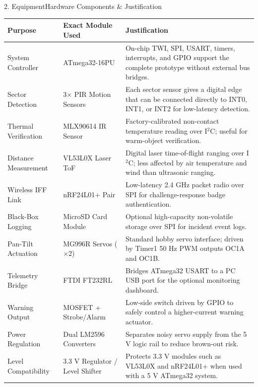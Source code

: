 \documentclass[aspectratio=169, 10pt]{beamer}
\begin{document}
\begin{frame}{2. Equipment}{Hardware Components \& Justification}
    \tiny
    \begin{table}
        \centering
        \begin{tabular}{p{2.15cm} p{2.85cm} p{5.6cm}}
            \toprule
            \textbf{\color{Accent} Purpose} & \textbf{\color{Accent} Exact Module Used} & \textbf{\color{Accent} Justification} \\
            \midrule
            System Controller & ATmega32-16PU & On-chip TWI, SPI, USART, timers, interrupts, and GPIO support the complete prototype without external bus bridges. \\
            Sector Detection & 3$\times$ PIR Motion Sensors & Each sector sensor gives a digital edge that can be connected directly to INT0, INT1, or INT2 for low-latency detection. \\
            Thermal Verification & MLX90614 IR Sensor & Factory-calibrated non-contact temperature reading over I$^2$C; useful for warm-object verification. \\
            Distance Measurement & VL53L0X Laser ToF & Digital laser time-of-flight ranging over I$^2$C; less affected by air temperature and wind than ultrasonic ranging. \\
            Wireless IFF Link & nRF24L01+ Pair & Low-latency 2.4 GHz packet radio over SPI for challenge-response badge authentication. \\
            Black-Box Logging & MicroSD Card Module & Optional high-capacity non-volatile storage over SPI for incident event logs. \\
            Pan-Tilt Actuation & MG996R Servos ($\times$2) & Standard hobby servo interface; driven by Timer1 50 Hz PWM outputs OC1A and OC1B. \\
            Telemetry Bridge & FTDI FT232RL & Bridges ATmega32 USART to a PC USB port for the optional monitoring dashboard. \\
            Warning Output & MOSFET + Strobe/Alarm & Low-side switch driven by GPIO to safely control a higher-current warning actuator. \\
            Power Regulation & Dual LM2596 Converters & Separates noisy servo supply from the 5 V logic rail to reduce brown-out risk. \\
            Level Compatibility & 3.3 V Regulator / Level Shifter & Protects 3.3 V modules such as VL53L0X and nRF24L01+ when used with a 5 V ATmega32 system. \\
            \bottomrule
        \end{tabular}
    \end{table}
\end{frame}
\end{document}
